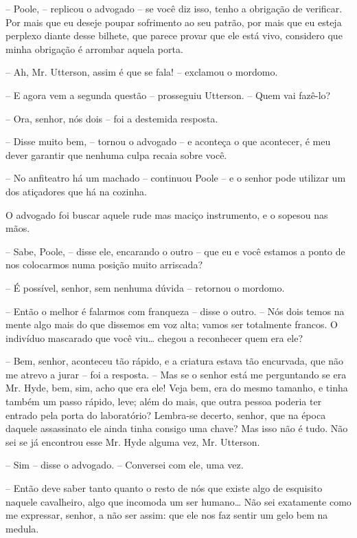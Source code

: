 -- Poole, -- replicou o advogado -- se você diz isso, tenho a obrigação de
verificar.  Por mais que eu deseje poupar sofrimento ao seu patrão, por
mais que eu esteja perplexo diante desse bilhete, que parece provar que
ele está vivo, considero que minha obrigação é arrombar aquela porta.

-- Ah, Mr. Utterson, assim é que se fala! -- exclamou o mordomo. 

-- E agora vem a segunda questão -- prosseguiu Utterson. -- Quem vai
fazê-lo?

-- Ora, senhor, nós dois -- foi a destemida resposta.

-- Disse muito bem, -- tornou o advogado -- e aconteça o que acontecer, é
meu dever garantir que nenhuma culpa recaia sobre você.

-- No anfiteatro há um machado -- continuou Poole -- e o senhor pode
utilizar um dos atiçadores que há na cozinha.

O advogado foi buscar aquele rude mas maciço instrumento, e o sopesou
nas mãos.

-- Sabe, Poole, -- disse ele, encarando o outro -- que eu e você estamos
a ponto de nos colocarmos numa posição muito arriscada?

-- É possível, senhor, sem nenhuma dúvida -- retornou o mordomo.

-- Então o melhor é falarmos com franqueza -- disse o outro. -- Nós dois
temos na mente algo mais do que dissemos em voz alta; vamos ser
totalmente francos.  O indivíduo mascarado que você viu\ldots{} chegou a
reconhecer quem era ele?

-- Bem, senhor, aconteceu tão rápido, e a criatura estava tão
encurvada, que não me atrevo a jurar -- foi a resposta. -- Mas se o senhor
está me perguntando se era Mr. Hyde, bem, sim, acho que era ele!  Veja
bem, era do mesmo tamanho, e tinha também um passo rápido, leve; além
do mais, que outra pessoa poderia ter entrado pela porta do
laboratório?  Lembra-se decerto, senhor, que na época daquele
assassinato ele ainda tinha consigo uma chave?  Mas isso não é tudo. 
Não sei se já encontrou esse Mr. Hyde alguma vez, Mr. Utterson.

-- Sim -- disse o advogado. -- Conversei com ele, uma vez.

-- Então deve saber tanto quanto o resto de nós que existe algo de
esquisito naquele cavalheiro, algo que incomoda um ser humano\ldots{}  Não
sei exatamente como me expressar, senhor, a não ser assim: que ele nos
faz sentir um gelo bem na medula.

